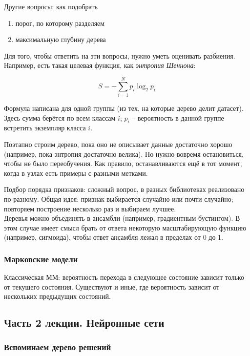 \documentclass[main.tex]{subfiles}
\begin{document}
Другие вопросы: как подобрать
\begin{enumerate}[noitemsep]
	\item порог, по которому разделяем
	\item максимальную глубину дерева
\end{enumerate}

Для того, чтобы ответить на эти вопросы, нужно уметь оценивать разбиения.
Например, есть такая целевая функция, как \emph{энтропия Шеннона}:

$$ S = - \sum_{i=1}^{N} p_i \log_2 p_i $$

Формула написана для одной группы (из тех, на которые дерево делит датасет).
Здесь сумма берётся по всем классам $i$; $p_i$ -- вероятность в данной группе встретить экземпляр класса $i$.

Поэтапно строим дерево, пока оно не описывает данные достаточно хорошо (например, пока энтропия достаточно велика).
Но нужно вовремя остановиться, чтобы не было переобучения.
Как правило, останавливаются ещё в тот момент, когда в узлах есть примеры с разными метками.

Подбор порядка признаков: сложный вопрос, в разных библиотеках реализовано по-разному.
Общая идея: признак выбирается случайно или почти случайно; повторяем построение несколько раз и выбираем лучшее. \\

Деревья можно объединять в ансамбли (например, градиентным бустингом).
В этом случае имеет смысл брать от ответа некоторую масштабирующую функцию (например, сигмоида), чтобы ответ ансамбля лежал в пределах от 0 до 1.

\subsubsection{Марковские модели}

Классическая ММ: вероятность перехода в следующее состояние зависит только от текущего состояния.
Существуют и иные, где вероятность зависит от нескольких предыдущих состояний.

\subsection{Часть 2 лекции. Нейронные сети}

\subsubsection{Вспоминаем дерево решений}
\end{document}
